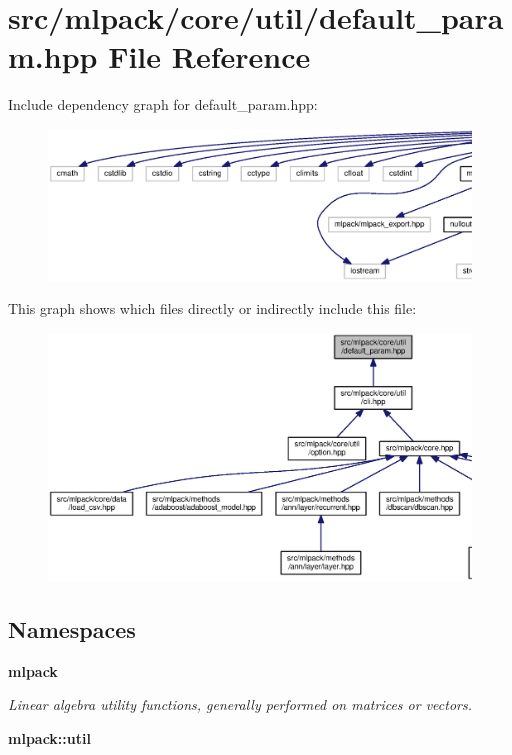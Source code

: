\section{src/mlpack/core/util/default\+\_\+param.hpp File Reference}
\label{default__param_8hpp}
Include dependency graph for default\+\_\+param.\+hpp\+:
\nopagebreak
\begin{figure}[H]
\begin{center}
\leavevmode
\includegraphics[width=350pt]{default__param_8hpp__incl}
\end{center}
\end{figure}
This graph shows which files directly or indirectly include this file\+:
\nopagebreak
\begin{figure}[H]
\begin{center}
\leavevmode
\includegraphics[width=350pt]{default__param_8hpp__dep__incl}
\end{center}
\end{figure}
\subsection*{Namespaces}
\begin{DoxyCompactItemize}
\item 
 {\bf mlpack}
\begin{DoxyCompactList}\small\item\em Linear algebra utility functions, generally performed on matrices or vectors. \end{DoxyCompactList}\item 
 {\bf mlpack\+::util}
\end{DoxyCompactItemize}
